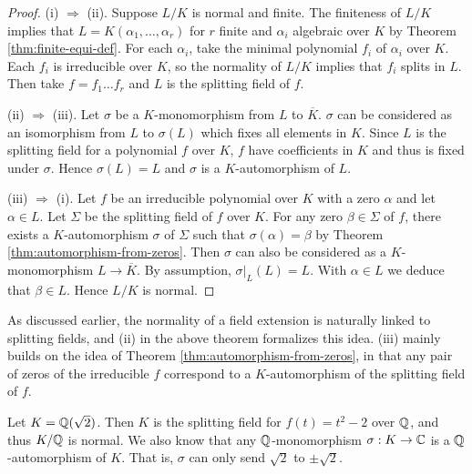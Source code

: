 \begin{proof}
    (i) $\Rightarrow$ (ii). 
    Suppose $L/K$ is normal and finite. The finiteness of $L/K$ implies that $L = K(\alpha_1, \dots, \alpha_r)$ for $r$ finite and $\alpha_i$ algebraic over $K$ by Theorem \ref{thm:finite-equi-def}. For each $\alpha_i$, take the minimal polynomial $f_i$ of $\alpha_i$ over $K$. Each $f_i$ is irreducible over $K$, so the normality of $L/K$ implies that $f_i$ splits in $L$.  Then take $f = f_1 \dots f_r$ and $L$ is the splitting field of $f$.
	
    

    (ii) $\Rightarrow$ (iii). Let $\sigma$ be a $K$-monomorphism from $L$ to $\overline K$. $\sigma$ can be considered as an isomorphism from $L$ to $\sigma(L)$ which fixes all elements in $K$. Since $L$ is the splitting field for a polynomial $f$ over $K$, $f$ have coefficients in $K$ and thus is fixed under $\sigma$. Hence $\sigma(L) = L$ and $\sigma$ is a $K$-automorphism of $L$. 
    
    (iii) $\Rightarrow$ (i). Let $f$ be an irreducible polynomial over $K$ with a zero $\alpha$ and let $\alpha \in L$. Let $\Sigma$ be the splitting field of $f$ over $K$. For any zero $\beta \in \Sigma$ of $f$, there exists a $K$-automorphism $\sigma$ of $\Sigma $ such that $\sigma(\alpha) = \beta$ by Theorem \ref{thm:automorphism-from-zeros}. Then $\sigma$ can also be considered as a $K$-monomorphism $L \to \overline K$. By assumption, $\sigma|_L(L) = L$. With $\alpha \in L$ we deduce that $\beta \in L$. Hence $L/K$ is normal.
\end{proof}

As discussed earlier, the normality of a field extension is naturally linked to splitting fields, and (ii) in the above theorem formalizes this idea. (iii) mainly builds on the idea of Theorem \ref{thm:automorphism-from-zeros}, in that any pair of zeros of the irreducible $f$ correspond to a $K$-automorphism of the splitting field of $f$. 

\begin{example}
	Let $K = \mathbb Q (\sqrt 2)$. Then $K$ is the splitting field for $f(t) = t^2 - 2$ over $\mathbb Q$, and thus $K/ \mathbb Q$ is normal. We also know that any $\mathbb Q$-monomorphism $\sigma: K \to \mathbb C$ is a $\mathbb Q$-automorphism of $K$. That is, $\sigma$ can only send $\sqrt 2$ to $\pm \sqrt 2$. 
\end{example}

